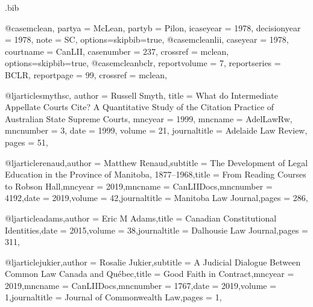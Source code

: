 \begin{filecontents*}[overwrite]{\jobname.bib}


@case{mclean,
  partya = {McLean}, 
  partyb = {Pilon},
  icaseyear = {1978},
  decisionyear = {1978},
  note = {SC},
  options={skipbib=true},
  }
@case{mcleanlii,
  caseyear = {1978},
  courtname = {CanLII},
  casenumber = {237},
  crossref = {mclean},
  options={skipbib=true},
  }
@case{mcleanbclr,
  reportvolume = {7},
  reportseries = {BCLR},
  reportpage = {99},
  crossref = {mclean},
  }








@ljarticle{smythsc,
author = {Russell Smyth},
title = {What do Intermediate Appellate Courts Cite? A Quantitative Study of the Citation Practice of Australian State Supreme Courts},
mncyear = {1999},
mncname = {AdelLawRw},
mncnumber = {3},
date = {1999},
volume = {21},
journaltitle = {Adelaide Law Review},
pages = {51},
}

@ljarticle{renaud,author = {Matthew Renaud},subtitle = {The Development of Legal Education in the Province of Manitoba, 1877–1968},title = {From Reading Courses to Robson Hall},mncyear = {2019},mncname = {CanLIIDocs},mncnumber = {4192},date = {2019},volume = {42},journaltitle = {Manitoba Law Journal},pages = {286},}

@ljarticle{adams,author = {Eric M Adams},title = {Canadian Constitutional Identities},date = {2015},volume = {38},journaltitle = {Dalhousie Law Journal},pages = {311},}


@ljarticle{jukier,author = {Rosalie Jukier},subtitle = {A Judicial Dialogue Between Common Law Canada and Québec},title = {Good Faith in Contract},mncyear = {2019},mncname = {CanLIIDocs},mncnumber = {1767},date = {2019},volume = {1},journaltitle = {Journal of Commonwealth Law},pages = {1},}


\end{filecontents*}
